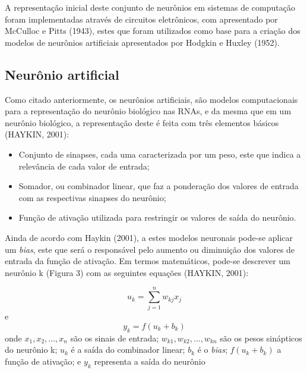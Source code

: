 

A representação inicial deste conjunto de neurônios em sistemas de computação foram implementadas através de circuitos eletrônicos, com apresentado por McCulloc e Pitts (1943), estes que foram utilizados como base para a criação dos modelos de neurônios artificiais apresentados por Hodgkin e Huxley (1952).

\subsection{Neurônio artificial}

Como citado anteriormente, os neurônios artificiais, são modelos computacionais para a representação do neurônio biológico nas RNAs, e da mesma que em um neurônio biológico, a representação deste é feita com três elementos básicos (HAYKIN, 2001):  

\begin{itemize}
	\item Conjunto de sinapses, cada uma caracterizada por um peso, este que indica a relevância de cada valor de entrada;
	\item Somador, ou combinador linear, que faz a ponderação dos valores de entrada com as respectivas sinapses do neurônio;
	\item Função de ativação utilizada para restringir os valores de saída do neurônio.
\end{itemize}

Ainda de acordo com Haykin (2001), a estes modelos neuronais pode-se aplicar um \textit{bias}, este que será o responsável pelo aumento ou diminuição dos valores de entrada da função de ativação. Em termos matemáticos, pode-se descrever um neurônio k (Figura 3) com as seguintes equações (HAYKIN, 2001):

\begin{equation}
	u_{k} = \sum_{j=1}^{n} w_{kj} x_{j}
\end{equation}
e
\begin{equation}
	y_{k} = f(u_{k} + b_{k})	
\end{equation}
onde $ x_{1}, x_{2}, ..., x_{n} $ são os sinais de entrada; $ w_{k1}, w_{k2}, ..., w_{kn} $ são os pesos sinápticos do neurônio k; $ u_{k} $ é a saída do combinador linear; $ b_{k} $ é o \textit{bias}; $ f(u_{k} + b_{k}) $ a função de ativação; e $ y_{k} $ representa a saída do neurônio

